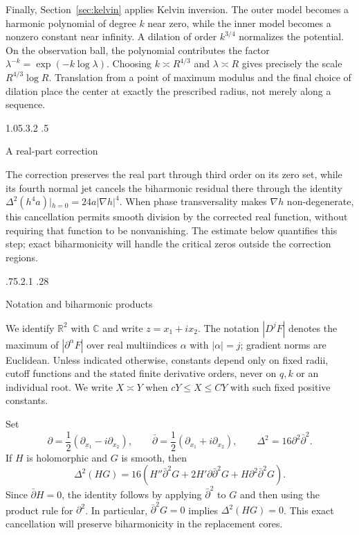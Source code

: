 \documentclass[11pt,a4paper,leqno]{amsart}
\makeatletter
\numberwithin{equation}{section}
\theoremstyle{landisplain}
\theoremstyle{landisdefinition}
\theoremstyle{landisremark}
\newcommand{\R}{\mathbb R}
\newcommand{\C}{\mathbb C}
\newcommand{\pa}{\partial}
\newcommand{\pb}{\bar\partial}
\renewcommand\section{\Needspace{7\baselineskip}\@startsection{section}{1}{\z@}%
  {1.05\baselineskip \@plus .3\baselineskip \@minus .2\baselineskip}%
  {.5\baselineskip}%
  {\normalfont\large\bfseries\raggedright}}
\renewcommand\subsection{\@startsection{subsection}{2}{\z@}%
  {.75\baselineskip \@plus .2\baselineskip \@minus .1\baselineskip}%
  {.28\baselineskip}%
  {\normalfont\bfseries\raggedright}}
\makeatother
\begin{document}
Finally, Section~\ref{sec:kelvin} applies Kelvin inversion. The
outer model becomes a harmonic polynomial of degree $k$ near
zero, while the inner model becomes a nonzero constant near
infinity. A dilation of order $k^{3/4}$ normalizes the potential.
On the observation ball, the polynomial contributes the factor
$\lambda^{-k}=\exp(-k\log\lambda)$. Choosing
$k\asymp R^{4/3}$ and $\lambda\asymp R$ gives precisely
the scale $R^{4/3}\log R$. Translation from a point of maximum
modulus and the final choice of dilation place the center at
exactly the prescribed radius, not merely along a sequence.

\section{A real-part correction}
\label{sec:repair}

The correction preserves the real part through third order on
its zero set, while its fourth normal jet cancels the biharmonic
residual there through the identity
$\Delta^2(h^4a)|_{h=0}=24a|\nabla h|^4$. When phase transversality
makes $\nabla h$ non-degenerate, this cancellation permits smooth
division by the corrected real function, without requiring that
function to be nonvanishing. The estimate below quantifies this
step; exact biharmonicity will handle the critical zeros outside
the correction regions.

\subsection{Notation and biharmonic products}

We identify $\R^2$ with $\C$ and write $z=x_1+ix_2$.
The notation $|D^jF|$ denotes the maximum of $|\pa^\alpha F|$
over real multiindices $\alpha$ with $|\alpha|=j$; gradient norms
are Euclidean. Unless indicated otherwise, constants depend only
on fixed radii, cutoff functions and the stated finite derivative
orders, never on $q,k$ or an individual root. We write $X\asymp Y$
when $cY\le X\le CY$ with such fixed positive constants.

Set
\[
 \pa=\frac12(\pa_{x_1}-i\pa_{x_2}),\qquad
 \pb=\frac12(\pa_{x_1}+i\pa_{x_2}),\qquad
 \Delta^2=16\pa^2\pb^2.
\]
If $H$ is holomorphic and $G$ is smooth, then
\begin{equation}\label{eq:prod}
 \Delta^2(HG)=16\left(H''\pb^2G+2H'\pa\pb^2G
                                  +H\pa^2\pb^2G\right).
\end{equation}
Since $\pb H=0$, the identity follows by applying $\pb^2$ to
$G$ and then using the product rule for $\pa^2$. In particular,
$\pb^2G=0$ implies $\Delta^2(HG)=0$. This exact cancellation
will preserve biharmonicity in the replacement cores.
\end{document}

